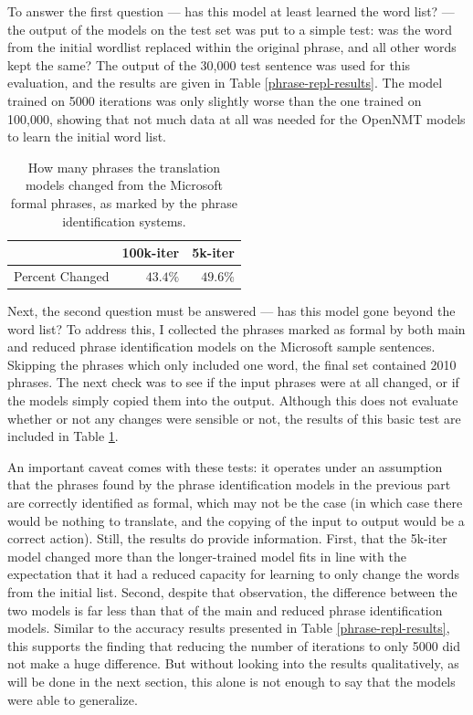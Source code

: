 To answer the first question --- has this model at least learned the word list? --- the output of the models on the test set was put to a simple test: was the word from the initial wordlist replaced within the original phrase, and all other words kept the same? The output of the 30,000 test sentence was used for this evaluation, and the results are given in Table \ref{phrase-repl-results}. The model trained on 5000 iterations was only slightly worse than the one trained on 100,000, showing that not much data at all was needed for the OpenNMT models to learn the initial word list.

\begin{table}[h]
\centering
 \begin{tabular}{|| l | r | r ||}
 \hline
  & 100k-iter & 5k-iter \\ [0.3ex] 
 \hline\hline
 Percent Changed & $43.4\%$ & $49.6\%$ \\
 \hline
\end{tabular}
\caption{How many phrases the translation models changed from the Microsoft formal phrases, as marked by the phrase identification systems.}
\label{phrase-repl-mic-test}
\end{table}

Next, the second question must be answered --- has this model gone beyond the word list? To address this, I collected the phrases marked as formal by both main and reduced phrase identification models on the Microsoft sample sentences. Skipping the phrases which only included one word, the final set contained 2010 phrases. The next check was to see if the input phrases were at all changed, or if the models simply copied them into the output. Although this does not evaluate whether or not any changes were sensible or not, the results of this basic test are included in Table \ref{phrase-repl-mic-test}.

An important caveat comes with these tests: it operates under an assumption that the phrases found by the phrase identification models in the previous part are correctly identified as formal, which may not be the case (in which case there would be nothing to translate, and the copying of the input to output would be a correct action). Still, the results do provide information. First, that the 5k-iter model changed more than the longer-trained model fits in line with the expectation that it had a reduced capacity for learning to only change the words from the initial list. Second, despite that observation, the difference between the two models is far less than that of the main and reduced phrase identification models. Similar to the accuracy results presented in Table \ref{phrase-repl-results}, this supports the finding that reducing the number of iterations to only 5000 did not make a huge difference. But without looking into the results qualitatively, as will be done in the next section, this alone is not enough to say that the models were able to generalize.


